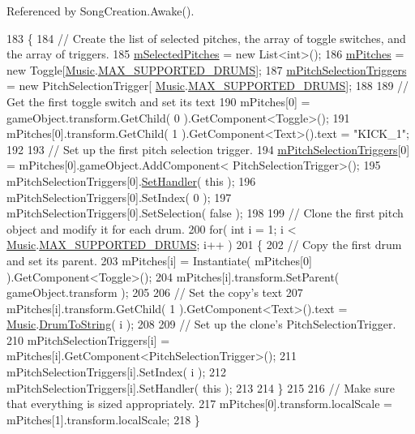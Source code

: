 Referenced by Song\+Creation.\+Awake().


\begin{DoxyCode}
183         \{
184             \textcolor{comment}{// Create the list of selected pitches, the array of toggle switches, and the array of
       triggers.}
185             \hyperlink{group___s_c_handlers_ga816236cbae1f13ea34be94fb1b86b7cd}{mSelectedPitches} = \textcolor{keyword}{new} List<int>();
186             \hyperlink{group___s_c_handlers_ga19dbd38f92df12e9b3d52b01634fdc53}{mPitches} = \textcolor{keyword}{new} Toggle[\hyperlink{class_music}{Music}.\hyperlink{group___music_constants_gabce1a1ac5b9b6355af6bd7fb3868467a}{MAX\_SUPPORTED\_DRUMS}];
187             \hyperlink{group___s_c_handlers_ga1affedf973b4aa39505b35053c12df7e}{mPitchSelectionTriggers} = \textcolor{keyword}{new} PitchSelectionTrigger[
      \hyperlink{class_music}{Music}.\hyperlink{group___music_constants_gabce1a1ac5b9b6355af6bd7fb3868467a}{MAX\_SUPPORTED\_DRUMS}];
188 
189             \textcolor{comment}{// Get the first toggle switch and set its text}
190             mPitches[0] = gameObject.transform.GetChild( 0 ).GetComponent<Toggle>();
191             mPitches[0].transform.GetChild( 1 ).GetComponent<Text>().text = \textcolor{stringliteral}{"KICK\_1"};
192 
193             \textcolor{comment}{// Set up the first pitch selection trigger.}
194             \hyperlink{group___s_c_handlers_ga1affedf973b4aa39505b35053c12df7e}{mPitchSelectionTriggers}[0] = mPitches[0].gameObject.AddComponent<
      PitchSelectionTrigger>();
195             mPitchSelectionTriggers[0].\hyperlink{group___s_c_handlers_ga963bc1a13bdd44643cf814aa4976f3d0}{SetHandler}( \textcolor{keyword}{this} );
196             mPitchSelectionTriggers[0].SetIndex( 0 );
197             mPitchSelectionTriggers[0].SetSelection( \textcolor{keyword}{false} );
198 
199             \textcolor{comment}{// Clone the first pitch object and modify it for each drum.}
200             \textcolor{keywordflow}{for}( \textcolor{keywordtype}{int} i = 1; i < \hyperlink{class_music}{Music}.\hyperlink{group___music_constants_gabce1a1ac5b9b6355af6bd7fb3868467a}{MAX\_SUPPORTED\_DRUMS}; i++ )
201             \{
202                 \textcolor{comment}{// Copy the first drum and set its parent.}
203                 mPitches[i] = Instantiate( mPitches[0] ).GetComponent<Toggle>();
204                 mPitches[i].transform.SetParent( gameObject.transform );
205 
206                 \textcolor{comment}{// Set the copy's text}
207                 mPitches[i].transform.GetChild( 1 ).GetComponent<Text>().text = 
      \hyperlink{class_music}{Music}.\hyperlink{group___music_stat_func_gaf5f64ebe9a7e036e07f283e41f26d22b}{DrumToString}( i );
208 
209                 \textcolor{comment}{// Set up the clone's PitchSelectionTrigger.}
210                 mPitchSelectionTriggers[i] = mPitches[i].GetComponent<PitchSelectionTrigger>();
211                 mPitchSelectionTriggers[i].SetIndex( i );
212                 mPitchSelectionTriggers[i].SetHandler( \textcolor{keyword}{this} );
213 
214             \}
215 
216             \textcolor{comment}{// Make sure that everything is sized appropriately.}
217             mPitches[0].transform.localScale = mPitches[1].transform.localScale;
218         \}
\end{DoxyCode}
